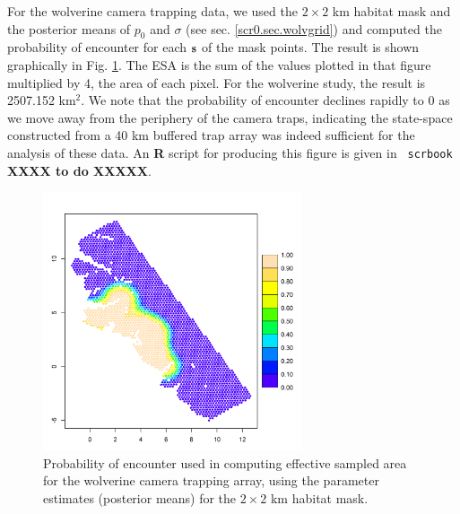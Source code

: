{For the wolverine camera trapping data, we used the
$2 \times 2$ km habitat mask and the posterior means of $p_{0}$ and $\sigma$ (see
sec. \ref{scr0.sec.wolvgrid}) and computed the
probability of encounter for each ${\bf s}$ of the mask points. The
result is shown graphically in Fig. \ref{scr0.fig.esa}. The ESA
is the sum of the values plotted in that figure multiplied by 4, the
area of each pixel. For the wolverine study, the result is
2507.152 km$^2$. We note that the probability of encounter declines
rapidly to 0 as we move away from the periphery of the camera traps,
indicating the state-space constructed from a 40 km buffered trap
array was indeed sufficient for the analysis of these data.
An {\bf R} script for producing this figure is given in \mbox{\tt
  scrbook} {\bf XXXX to do XXXXX}.

\begin{figure}[ht]
\begin{center}
\includegraphics[height=3in]{Ch4-SCR0/figs/wolv_esa}
\end{center}
\caption{Probability of encounter used in computing effective sampled
  area for the wolverine camera trapping array, using the parameter
  estimates (posterior means) for the $2 \times 2$ km habitat mask.  }
\label{scr0.fig.esa}
\end{figure}

















}
